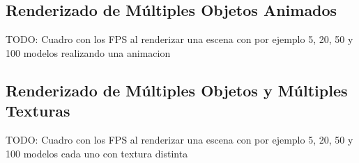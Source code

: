 \subsection{Renderizado de Múltiples Objetos Animados}
TODO: Cuadro con los FPS al renderizar una escena con por ejemplo
5, 20, 50 y 100 modelos realizando una animacion
\subsection{Renderizado de Múltiples Objetos y Múltiples Texturas}
TODO: Cuadro con los FPS al renderizar una escena con por ejemplo
5, 20, 50 y 100 modelos cada uno con textura distinta

